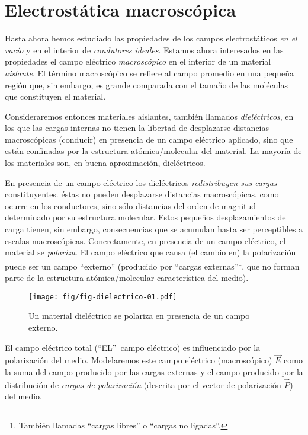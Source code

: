 \newpage

\section{Electrostática macroscópica}
Hasta ahora hemos estudiado las propiedades de los campos
electrostáticos \textit{en el vacío} y en el interior de \textit{condutores ideales}.
Estamos ahora interesados en las propiedades el campo eléctrico \textit{macroscópico} en el interior de un material \textit{aislante}. El término macroscópico se refiere al campo promedio en una pequeña región que, sin embargo, es grande comparada con el tamaño de las moléculas que constituyen el material.

Consideraremos entonces materiales aislantes, también llamados \textit{dieléctricos}, en los que las cargas internas no tienen la
libertad de desplazarse distancias macroscópicas (conducir) en presencia de un
campo eléctrico aplicado, sino que están confinadas por la estructura
atómica/molecular del material. La mayoría de los materiales son, en buena
aproximación, dieléctricos.

En presencia de un campo eléctrico los dieléctricos \textit{redistribuyen sus cargas} constituyentes. éstas no pueden desplazarse distancias macroscópicas,
como ocurre en los conductores, sino sólo distancias del orden de magnitud determinado por su estructura molecular.
Estos pequeños desplazamientos de carga tienen, sin embargo, consecuencias
que se acumulan hasta ser perceptibles a escalas macroscópicas.
Concretamente, en presencia de un campo eléctrico, el material
se \textit{polariza}.
El campo eléctrico que causa (el cambio en) la polarización puede ser un campo ``externo'' (producido por ``cargas externas''\footnote{También llamadas ``cargas libres'' o ``cargas no ligadas''.}, que no forman parte
de la estructura atómica/molecular característica del medio).
\begin{figure}[!h]
\centerline{\texttt{[image: fig/fig-dielectrico-01.pdf]}}
\caption{Un material dieléctrico se polariza en presencia de un campo externo.}
\label{diel01}
\end{figure}

El campo eléctrico total (``EL''\, campo eléctrico) es influenciado por
la polarización del medio. Modelaremos este campo eléctrico
(macroscópico) $\vec{E}$ como la suma del campo
producido por las cargas externas y el campo producido por la distribución
de \textit{cargas de polarización} (descrita por el vector de polarización $\vec{P}$) del medio.

